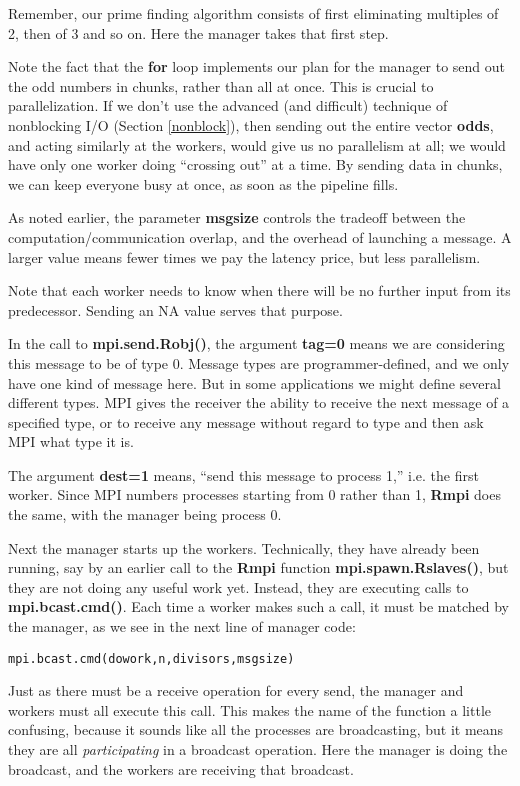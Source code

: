 Remember, our prime finding algorithm consists of first eliminating
multiples of 2, then of 3 and so on.  Here the manager takes that first
step.

Note the fact that the {\bf for} loop implements our plan for the
manager to send out the odd numbers in chunks, rather than all at once.
This is crucial to parallelization.  If we don't use the advanced (and
difficult) technique of nonblocking I/O (Section \ref{nonblock}), then
sending out the entire vector {\bf odds}, and acting similarly at the
workers, would give us no parallelism at all; we would have only one
worker doing ``crossing out'' at a time.  By sending data in chunks, we
can keep everyone busy at once, as soon as the pipeline fills.  

As noted earlier, the parameter {\bf msgsize} controls the tradeoff
between the computation/communication overlap, and the overhead of
launching a message.  A larger value means fewer times we pay the
latency price, but less parallelism.

Note that each worker needs to know when there will be no further input
from its predecessor.  Sending an NA value serves that purpose.

In the call to {\bf mpi.send.Robj()}, the argument {\bf tag=0} means we
are considering this message to be of type 0.  Message types are
programmer-defined, and we only have one kind of message here.  But in
some applications we might define several different types.  MPI gives
the receiver the ability to receive the next message of a specified
type, or to receive any message without regard to type and then ask MPI
what type it is.

The argument {\bf dest=1} means, ``send this message to process 1,''
i.e. the first worker.  Since MPI numbers processes starting from 0
rather than 1, {\bf Rmpi} does the same, with the manager being
process 0.

Next the manager starts up the workers.  Technically, they have already
been running, say by an earlier call to the {\bf Rmpi} function {\bf
mpi.spawn.Rslaves()}, but they are not doing any useful work yet.
Instead, they are executing calls to {\bf mpi.bcast.cmd()}.  Each time a
worker makes such a call, it must be matched by the manager, as we see
in the next line of manager code:

\begin{lstlisting}
mpi.bcast.cmd(dowork,n,divisors,msgsize)
\end{lstlisting}

Just as there must be a receive operation for every send, the manager
and workers must all execute this call.  This makes the name of the
function a little confusing, because it sounds like all the processes
are broadcasting, but it means they are all {\it participating} in a
broadcast operation.  Here the manager is doing the broadcast, and the
workers are receiving that broadcast.


